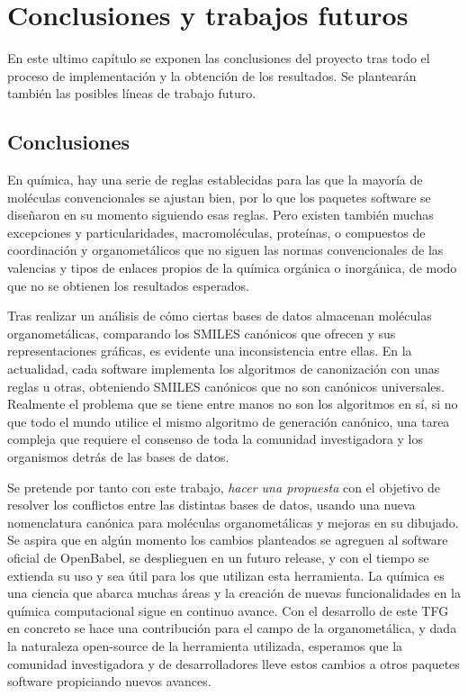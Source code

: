 \chapter{Conclusiones y trabajos futuros} \label{cap:conclusiones}

En este ultimo capítulo se exponen las conclusiones del proyecto tras todo el proceso de implementación y la obtención de los resultados. Se plantearán también las posibles líneas de trabajo futuro.

\section{Conclusiones}

En química, hay una serie de reglas establecidas para las que la mayoría de moléculas convencionales se ajustan bien, por lo que los paquetes software se diseñaron en su momento siguiendo esas reglas. Pero existen también muchas excepciones y particularidades, macromoléculas, proteínas, o compuestos de coordinación y organometálicos que no siguen las normas convencionales de las valencias y tipos de enlaces propios de la química orgánica o inorgánica, de modo que no se obtienen los resultados esperados.

Tras realizar un análisis de cómo ciertas bases de datos almacenan moléculas organometálicas, comparando los SMILES canónicos que ofrecen y sus representaciones gráficas, es evidente una inconsistencia entre ellas. En la actualidad, cada software implementa los algoritmos de canonización con unas reglas u otras, obteniendo SMILES canónicos que no son canónicos universales. Realmente el problema que se tiene entre manos no son los algoritmos en sí, si no que todo el mundo utilice el mismo algoritmo de generación canónico, una tarea compleja que requiere el consenso de toda la comunidad investigadora y los organismos detrás de las bases de datos.


Se pretende por tanto con este trabajo, \textit{hacer una propuesta} con el objetivo de resolver los conflictos entre las distintas bases de datos, usando una nueva nomenclatura canónica para moléculas organometálicas y mejoras en su dibujado.
Se aspira que en algún momento los cambios planteados se agreguen al software oficial de OpenBabel, se desplieguen en un futuro release, y con el tiempo se extienda su uso y sea útil para los que utilizan esta herramienta. La química es una ciencia que abarca muchas áreas y la creación de nuevas funcionalidades en la química computacional sigue en continuo avance. Con el desarrollo de este TFG en concreto se hace una contribución para el campo de la organometálica, y dada la naturaleza open-source de la herramienta utilizada, esperamos que la comunidad investigadora y de desarrolladores lleve estos cambios a otros paquetes software propiciando nuevos avances.


